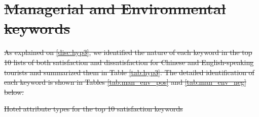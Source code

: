 \documentclass[smallextended,natbib]{svjour3}       %
\providecommand{\DIFdel}[1]{{\protect\color{red}\sout{#1}}}                      %
\providecommand{\DIFdelFL}[1]{\DIFdel{#1}} %
\begin{document}
\section{\DIFdel{Managerial and Environmental keywords}}%
\addtocounter{section}{-1}%

\DIFdel{As explained on \ref{disc:hyp3}, we identified the nature of each keyword in the top 10 lists of both satisfaction and dissatisfaction for Chinese and English-speaking tourists and summarized them in Table \ref{tab:hyp3}. The detailed identification of each keyword is shown in Tables \ref{tab:man_env_pos} and \ref{tab:man_env_neg} below.
}%

{%
\DIFdelFL{Hotel attribute types for the top 10 satisfaction keywords}}
\end{document}
